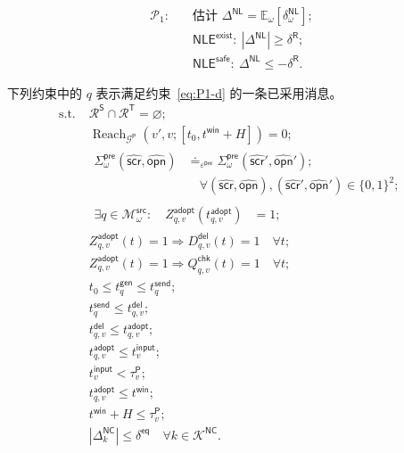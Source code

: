 \documentclass[10pt,a4paper,twocolumn]{article}
\begin{document}
\begin{equation}\label{eq:P1}
\begin{aligned}
\mathcal P_1:\quad
&\text{估计 }\Delta^{\mathsf{NL}}=\mathbb E_\omega[\delta_\omega^{\mathsf{NL}}];\\
&\mathsf{NLE}^{\mathsf{exist}}:\ |\Delta^{\mathsf{NL}}|\geq\delta^{\mathsf R};\\
&\mathsf{NLE}^{\mathsf{safe}}:\ \Delta^{\mathsf{NL}}\leq-\delta^{\mathsf R}.
\end{aligned}
\end{equation}
\addtocounter{equation}{-1}
下列约束中的 $q$ 表示满足约束~\eqref{eq:P1-d} 的一条已采用消息。
\begin{subequations}
\begin{align}
\mathrm{s.t.}\;&\mathcal R^{\mathsf S}\cap\mathcal R^{\mathsf T}=\varnothing;
\label{eq:P1-a}\\
&\operatorname{Reach}_{\mathcal G^{\mathsf P}}\!(v',v;[t_0,t^{\mathsf{win}}+H])=0;
\label{eq:P1-b}\\
&\begin{aligned}
\Sigma_{\omega}^{\mathsf{pre}}(\hat{\mathsf{scr}},\hat{\mathsf{opn}})
&\doteq_{\varepsilon^{\mathsf{pre}}}
\Sigma_{\omega}^{\mathsf{pre}}(\hat{\mathsf{scr}}',\hat{\mathsf{opn}}');\\
&\quad\forall(\hat{\mathsf{scr}},\hat{\mathsf{opn}}),(\hat{\mathsf{scr}}',\hat{\mathsf{opn}}')\in\{0,1\}^{2};
\end{aligned}
\label{eq:P1-c}\\
&\begin{aligned}
\exists q\in\mathcal M_{\omega}^{\mathsf{src}}:\quad
Z_{q,v}^{\mathsf{adopt}}(t_{q,v}^{\mathsf{adopt}})&=1;
\end{aligned}
\label{eq:P1-d}\\
&Z_{q,v}^{\mathsf{adopt}}(t)=1\Rightarrow D_{q,v}^{\mathsf{del}}(t)=1\quad\forall t;
\label{eq:P1-e}\\
&Z_{q,v}^{\mathsf{adopt}}(t)=1\Rightarrow Q_{q,v}^{\mathsf{chk}}(t)=1\quad\forall t;
\label{eq:P1-f}\\
&t_0\leq t_q^{\mathsf{gen}}\leq t_q^{\mathsf{send}};
\label{eq:P1-g}\\
&t_q^{\mathsf{send}}\leq t_{q,v}^{\mathsf{del}};
\label{eq:P1-h}\\
&t_{q,v}^{\mathsf{del}}\leq t_{q,v}^{\mathsf{adopt}};
\label{eq:P1-i}\\
&t_{q,v}^{\mathsf{adopt}}\leq t_v^{\mathsf{input}};
\label{eq:P1-j}\\
&t_v^{\mathsf{input}}<\tau_v^{\mathsf P};
\label{eq:P1-k}\\
&t_{q,v}^{\mathsf{adopt}}\leq t^{\mathsf{win}};
\label{eq:P1-l}\\
&t^{\mathsf{win}}+H\leq\tau_v^{\mathsf P};
\label{eq:P1-m}\\
&\left|\Delta_{k}^{\mathsf{NC}}\right|\leq\delta^{\mathsf{eq}}
\quad\forall k\in\mathcal K^{\mathsf{NC}}.
\label{eq:P1-n}
\end{align}
\end{subequations}
\end{document}
